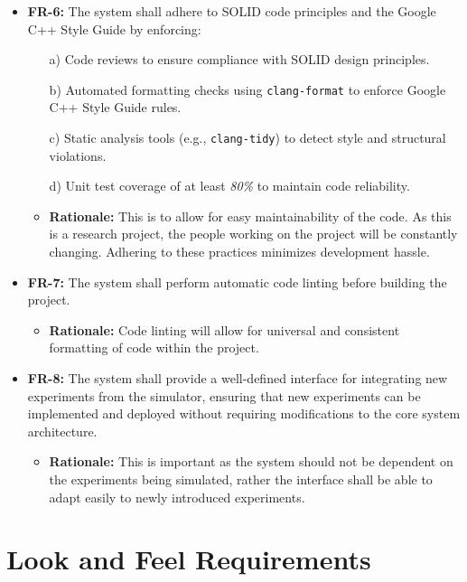 \documentclass[12pt]{article}
\begin{document}
\begin{itemize}
\begin{itemize}
  \end{itemize}
\item \label{FR-6} \textbf{FR-6:} The system shall adhere to SOLID code principles and the Google C++ Style Guide by enforcing:
  \begin{itemize}
      \item[a)] Code reviews to ensure compliance with SOLID design principles.
      \item[b)] Automated formatting checks using \texttt{clang-format} to enforce Google C++ Style Guide rules.
      \item[c)] Static analysis tools (e.g., \texttt{clang-tidy}) to detect style and structural violations.
      \item[d)] Unit test coverage of at least \textit{80\%} to maintain code reliability.
  \end{itemize}
\begin{itemize}
  \item \textbf{Rationale:} This is to allow for easy maintainability of the code. As this is a research project, the people working on the project will be constantly changing. Adhering to these practices minimizes development hassle.
\end{itemize}
\item \label{FR-7} \textbf{FR-7:} The system shall perform automatic code linting before building the project.
\begin{itemize}
  \item \textbf{Rationale:} Code linting will allow for universal and consistent formatting of code within the project. 
\end{itemize}
\item \label{FR-8} \textbf{FR-8:} The system shall provide a well-defined interface for integrating new experiments from the simulator, ensuring that new experiments can be implemented and deployed without requiring modifications to the core system architecture.
  \begin{itemize}
    \item \textbf{Rationale:} This is important as the system should not be dependent on the experiments being simulated, rather the interface shall be able to adapt easily to newly introduced experiments. 
  \end{itemize}
\end{itemize}
\section{Look and Feel Requirements}
\end{document}
